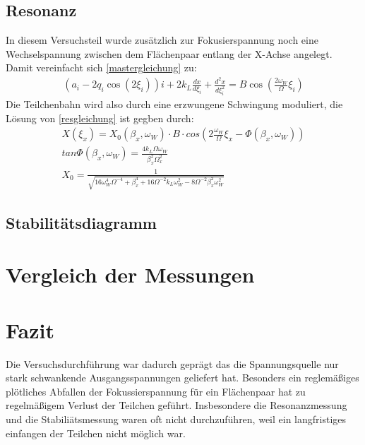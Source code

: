 \documentclass[a4paper,12pt]{article}
\begin{document}
\subsection{Resonanz}
In diesem Versuchsteil wurde zusätzlich zur Fokusierspannung noch eine Wechselspannung zwischen dem Flächenpaar entlang der X-Achse angelegt. Damit vereinfacht sich \ref{mastergleichung} zu: 
\begin{align*}\label{resgleichung}
	\left( a_i -2q_i \cos\left( 2\xi_i \right) \right) i  + 2k_L \frac{dx}{d\xi_i} + \frac{d^2x}{d\xi_i^2} = B\cos\left( \frac{2ω_W}{Ω}ξ_i \right)
\end{align*}
Die Teilchenbahn wird also durch eine erzwungene Schwingung moduliert, die Lösung von \ref{resgleichung} ist gegben durch:
\begin{align*}\label{resgleichung}
	X(\xi_x) = X_0( \beta_x,\omega_W ) \cdot B \cdot cos(2\frac{\omega_W}{\Omega}\xi_x - \Phi(\beta_x,\omega_W))
	\\
	 tan\Phi(\beta_x,\omega_W) = \frac{4 k_L \Omega \omega_W}{\beta_x^{2}\Omega_x^{2}} 
	 \\
	  X_0 = \frac{1}{\sqrt{16\omega^{4}_W\Omega^{-4}+\beta^{4}_x+16\Omega^{-2}k_L\omega^{2}_W-8\Omega^{-2}\beta^{2}_x\omega^{2}_W}}
\end{align*}
\subsection{Stabilitätsdiagramm}



\section{Vergleich der Messungen}

\section{Fazit}
Die Versuchsdurchführung war dadurch geprägt das die Spannungsquelle nur stark schwankende Ausgangsspannungen geliefert hat. Besonders ein reglemäßiges plötliches Abfallen der Fokussierspannung für ein 
Flächenpaar hat zu regelmäßigem Verlust der Teilchen geführt. Insbesondere die Resonanzmessung und die Stabiliätsmessung waren oft nicht durchzuführen, weil ein langfristiges einfangen der Teilchen nicht
möglich war.

\end{document}
